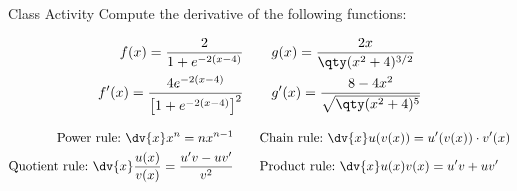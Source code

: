\documentclass[../tufte-style.tex]{standalone}
\begin{document}
\begin{frame}{Class Activity}
    Compute the derivative of the following functions:

            \begin{align*}
                f(x) = \frac{2}{1+e^{-2(x-4)}}\qquad & g(x) = \frac{2x}{\qty(x^{2}+4)^{3/2}} \\
                f'(x) = \frac{4 e^{-2(x-4)}}{\left[1+e^{-2(x-4)}\right]^{2}}\qquad & g'(x) = \frac{8-4x^2}{\sqrt{\qty(x^2+4)^5}} 
            \end{align*}

        \begin{align*}
            \text{Power rule:~} \dv{x}x^{n} = nx^{n-1}\qquad & \text{Chain rule:~} \dv{x}u(v(x)) = u'(v(x))\cdot v'(x)\\
            \text{Quotient rule:~} \dv{x}\frac{u(x)}{v(x)} = \frac{u'v - uv'}{v^{2}}\qquad & \text{Product rule:~} \dv{x}u(x)v(x) = u'v + uv'
        \end{align*}    

\end{frame}
\end{document}
